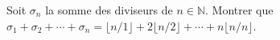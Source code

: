 Soit $\sigma_n$ la somme des diviseurs de $n \in \mathbb{N}$. Montrer que $\sigma_1 + \sigma_2 + \cdots + \sigma_n = \lfloor n/1 \rfloor + 2\lfloor n/2 \rfloor + \cdots + n\lfloor n/n \rfloor$.
